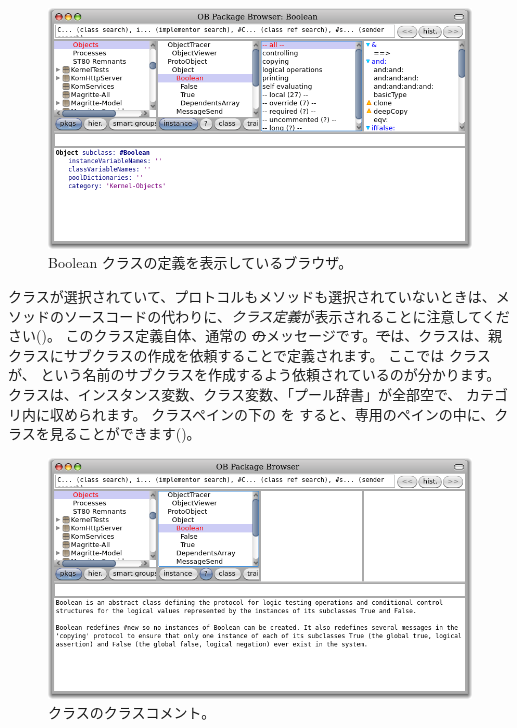 \documentclass[a4paper,10pt,twoside]{book}
\begin{document}

\begin{figure}[hbt]
\centerline {\includegraphics[width=\textwidth]{Kernel-objects-boolean}}
\caption{Boolean クラスの定義を表示しているブラウザ。
}
\end{figure}

 クラスが選択されていて、プロトコルもメソッドも選択されていないときは、メソッドのソースコードの代わりに、\emph{クラス定義}が表示されることに注意してください()。
このクラス定義自体、通常の \st のメッセージです。\st では、クラスは、親クラスにサブクラスの作成を依頼することで定義されます。
ここでは  クラスが、 という名前のサブクラスを作成するよう依頼されているのが分かります。 クラスは、インスタンス変数、クラス変数、「プール辞書」が全部空で、 カテゴリ内に収められます。
クラスペインの下の  を \click すると、専用のペインの中に、クラスを見ることができます()。

\begin{figure}[hbt]
\centerline {\includegraphics[width=\textwidth]{classComment}}
\caption{ クラスのクラスコメント。
}
\end{figure}
\end{document}
